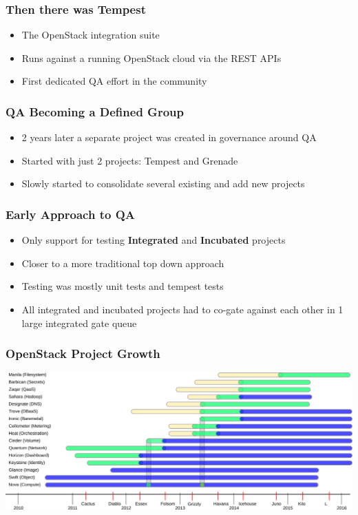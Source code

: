 \documentclass[aspectratio=43,11pt,hyperref={colorlinks=true}]{beamer}
\begin{document}
\begin{frame}
    \frametitle{Then there was Tempest}
    \begin{itemize}
        \item The OpenStack integration suite
        \item Runs against a running OpenStack cloud via the REST APIs
        \item First dedicated QA effort in the community
    \end{itemize}
\end{frame}

\begin{frame}
    \frametitle{QA Becoming a Defined Group}
    \begin{itemize}
        \item 2 years later a separate project was created in governance around QA
        \item Started with just 2 projects: Tempest and Grenade
        \item Slowly started to consolidate several existing and add new projects
    \end{itemize}
\end{frame}

\begin{frame}
    \frametitle{Early Approach to QA}
    \begin{itemize}
        \item Only support for testing \textbf{Integrated} and
              \textbf{Incubated} projects
        \item Closer to a more traditional top down approach
        \item Testing was mostly unit tests and tempest tests
        \item All integrated and incubated projects had to co-gate against
              each other in 1 large integrated gate queue
    \end{itemize}
\end{frame}

\begin{frame}
    \frametitle{OpenStack Project Growth}
    \begin{center}
        \includegraphics[width=1.1\textwidth]{OpenStack_Components.png}
    \end{center}
\end{frame}
\end{document}

